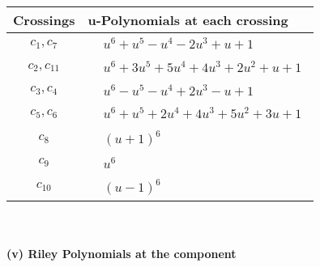 \documentclass[1p]{elsarticle_modified}
\theoremstyle{definition}
\begin{document}
\begin{tabular}{m{50pt}|m{274pt}}
Crossings & \hspace{64pt}u-Polynomials at each crossing \\
\hline $$\begin{aligned}c_{1},c_{7}\end{aligned}$$&$\begin{aligned}
&u^6+u^5- u^4-2 u^3+u+1
\end{aligned}$\\
\hline $$\begin{aligned}c_{2},c_{11}\end{aligned}$$&$\begin{aligned}
&u^6+3 u^5+5 u^4+4 u^3+2 u^2+u+1
\end{aligned}$\\
\hline $$\begin{aligned}c_{3},c_{4}\end{aligned}$$&$\begin{aligned}
&u^6- u^5- u^4+2 u^3- u+1
\end{aligned}$\\
\hline $$\begin{aligned}c_{5},c_{6}\end{aligned}$$&$\begin{aligned}
&u^6+u^5+2 u^4+4 u^3+5 u^2+3 u+1
\end{aligned}$\\
\hline $$\begin{aligned}c_{8}\end{aligned}$$&$\begin{aligned}
&(u+1)^6
\end{aligned}$\\
\hline $$\begin{aligned}c_{9}\end{aligned}$$&$\begin{aligned}
&u^6
\end{aligned}$\\
\hline $$\begin{aligned}c_{10}\end{aligned}$$&$\begin{aligned}
&(u-1)^6
\end{aligned}$\\
\hline
\end{tabular}\\~\\
\newpage\renewcommand{\arraystretch}{1}
\flushleft \textbf{(v) Riley Polynomials at the component}\newline \\
\end{document}
